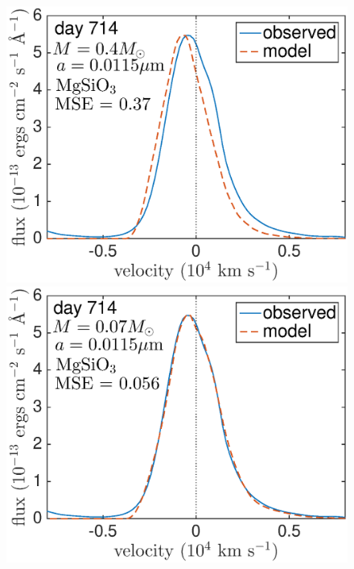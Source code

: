 \begin{figure}
\includegraphics[trim =0 30 0 0,clip=true,scale=0.34]{chapters/chapter5/images/silicates_take2/MgSiO3_Dwek_Ha.eps}
\hspace{3mm}
\includegraphics[trim =0 30 0 -10,clip=true,scale=0.34]{chapters/chapter5/images/silicates_take2/MgSiO3_bestfit_Ha.eps}


\end{figure}

